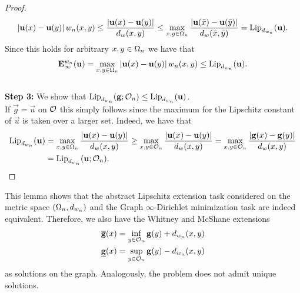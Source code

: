 \begin{proof}
%
\begin{align*}
\left|\mathbf{u}(x) - \mathbf{u}(y)\right| w_n(x,y)\leq 
\frac{\left|\mathbf{u}(x) - \mathbf{u}(y)\right|}{d_w(x,y)} \leq 
\max_{\bar{x}, \bar{y}\in\Omega_n}  
\frac{\left|\mathbf{u}(\bar x) - \mathbf{u}(\bar y)\right|}{d_w(\bar x,\bar y)} = \operatorname{Lip}_{d_{w_n}}(\mathbf{u}).
\end{align*}
%
Since this holds for arbitrary $x,y\in\Omega_n$ we have that
%
\begin{align*}
\mathbf{E}^{w_n}_\infty(\mathbf{u}) = \max_{x,y\in\Omega_n} \left|\mathbf{u}(x) - \mathbf{u}(y)\right| w_n(x,y)
\leq
\operatorname{Lip}_{d_{w_n}}(\mathbf{u}).
\end{align*}\\
\noindent%
\textbf{Step 3:} We show that $\operatorname{Lip}_{d_{w_n}}(\mathbf{g};\mathcal{O}_n) \leq \operatorname{Lip}_{d_{w_n}}(\mathbf{u})$.\\
%
If $\vec g = \vec u$ on $\mathcal{O}$ this simply follows since the maximum for the Lipschitz constant of $\vec u$ is taken over a larger set. Indeed, we have that
%
\begin{align*}
\operatorname{Lip}_{d_{w_n}}(\mathbf{u}) &= 
\max_{x,y\in\Omega_n} \frac{\left|\mathbf{u}(x) - \mathbf{u}(y)\right|}{d_w(x,y)}
\geq 
\max_{x,y\in\mathcal{O}_n} \frac{\left|\mathbf{u}(x) - \mathbf{u}(y)\right|}{d_w(x,y)}
=
\max_{x,y\in\mathcal{O}_n} \frac{\left|\mathbf{g}(x) - \mathbf{g}(y)\right|}{d_w(x,y)}\\
&=
\operatorname{Lip}_{d_{w_n}}(\mathbf{u}; \mathcal{O}_n).
\end{align*}
\end{proof}
%
%
%
\noindent%
This lemma shows that the abstract Lipschitz extension task considered on the metric space $(\Omega_n, d_{w_n})$ and the Graph $\infty$-Dirichlet minimization task are indeed equivalent. Therefore, we also have the Whitney and McShane extensions
%
\begin{align*}
\overline{\mathbf{g}}(x) &= \inf_{y\in\mathcal{O}_n} \mathbf{g} (y) + d_{w_n}(x,y)\\
\underline{\mathbf{g}}(x) &= \sup_{y\in\mathcal{O}_n} \mathbf{g} (y) - d_{w_n}(x,y)
\end{align*}
%
as solutions on the graph. Analogously, the problem does not admit unique solutions.
%
%
%
